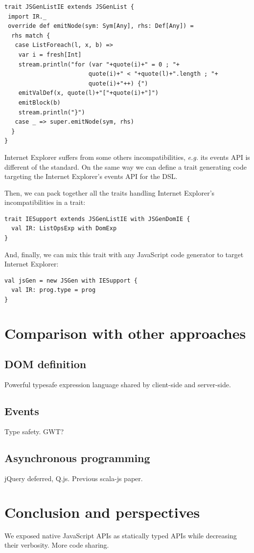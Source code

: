 \documentclass[american,english,runningheads]{llncs}
\newcommand{\eg}{\emph{e.g.}}
\begin{document}
\begin{lstlisting}
trait JSGenListIE extends JSGenList {
 import IR._
 override def emitNode(sym: Sym[Any], rhs: Def[Any]) =
  rhs match {
   case ListForeach(l, x, b) =>
    var i = fresh[Int]
    stream.println("for (var "+quote(i)+" = 0 ; "+
                        quote(i)+" < "+quote(l)+".length ; "+
                        quote(i)+"++) {")
    emitValDef(x, quote(l)+"["+quote(i)+"]")
    emitBlock(b)
    stream.println("}")
   case _ => super.emitNode(sym, rhs)
  }
}
\end{lstlisting}

Internet Explorer suffers from some others incompatibilities, \eg{} its events API is different of the standard. On the same way we can define a  trait generating code targeting the Internet Explorer’s events API for the  DSL.

Then, we can pack together all the traits handling Internet Explorer’s incompatibilities in a  trait:

\begin{lstlisting}
trait IESupport extends JSGenListIE with JSGenDomIE {
  val IR: ListOpsExp with DomExp
}
\end{lstlisting}

And, finally, we can mix this  trait with any JavaScript code generator to target Internet Explorer:

\begin{lstlisting}
val jsGen = new JSGen with IESupport {
  val IR: prog.type = prog
}
\end{lstlisting}

\section{Comparison with other approaches}

\subsection{DOM definition}

Powerful typesafe expression language shared by client-side and server-side.

\subsection{Events}

Type safety. GWT?

\subsection{Asynchronous programming}

jQuery deferred, Q.js. Previous scala-js paper.

\section{Conclusion and perspectives}

We exposed native JavaScript APIs as statically typed APIs while decreasing their verbosity.
More code sharing.



\end{document}
